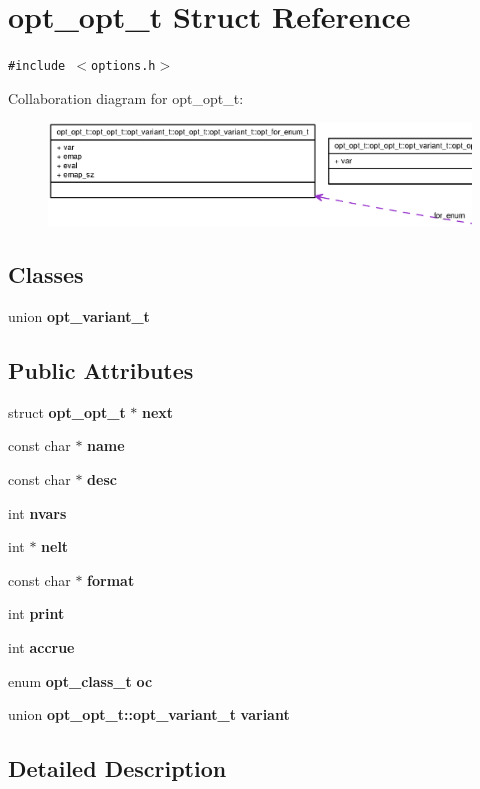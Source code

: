 \section{opt\_\-opt\_\-t Struct Reference}
\label{structopt__opt__t}
{\tt \#include $<$options.h$>$}

Collaboration diagram for opt\_\-opt\_\-t:\nopagebreak
\begin{figure}[H]
\begin{center}
\leavevmode
\includegraphics[width=400pt]{structopt__opt__t__coll__graph}
\end{center}
\end{figure}
\subsection*{Classes}
\begin{CompactItemize}
\item 
union {\bf opt\_\-variant\_\-t}
\end{CompactItemize}
\subsection*{Public Attributes}
\begin{CompactItemize}
\item 
struct {\bf opt\_\-opt\_\-t} $\ast$ {\bf next}
\item 
const char $\ast$ {\bf name}
\item 
const char $\ast$ {\bf desc}
\item 
int {\bf nvars}
\item 
int $\ast$ {\bf nelt}
\item 
const char $\ast$ {\bf format}
\item 
int {\bf print}
\item 
int {\bf accrue}
\item 
enum {\bf opt\_\-class\_\-t} {\bf oc}
\item 
union {\bf opt\_\-opt\_\-t::opt\_\-variant\_\-t} {\bf variant}
\end{CompactItemize}


\subsection{Detailed Description}


